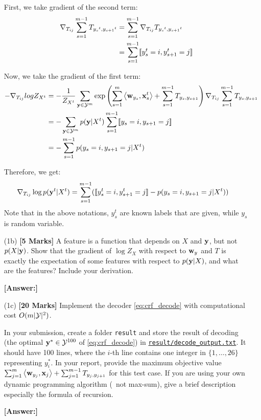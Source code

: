 \documentclass[11pt]{report}
\begin{document}
\begin{itemize}
 	First, we take gradient of the second term: 
	\begin{align}
		{\nabla}_{T_{ij}} \sum_{s=1}^{m-1} T_{{y_s}^t, {y_{s+1}}^t} &= \sum_{s=1}^{m-1} {\nabla}_{T_{ij}} T_{{y_s}^t, {y_{s+1}}^t} \\
		&= \sum_{s=1}^{m-1} [\![{y^t_s} = i, y^t_{s+1} = j]\!]
	\end{align}

 	Now, we take the gradient of the first term: 
	\begin{align}
		-{\nabla}_{T_{ij}} logZ_{X^t} &= -\frac{1}{Z_{X^t}} \sum_{\mathbf{\boldsymbol{y}} \in \mathcal{Y}^m}\exp \left(\sum_{s=1}^m \left\langle \mathbf{\boldsymbol{w}}_{y_s},\mathbf{\boldsymbol{x}}_s^t \right\rangle + \sum_{s=1}^{m-1} T_{y_s, y_{s+1}}\right) {\nabla}_{T_{ij}} \sum_{s=1}^{m-1} T_{{y_s}, {y_{s+1}}} \\
		&= -\sum_{\mathbf{\boldsymbol{y}} \in \mathcal{Y}^m}p(\mathbf{\boldsymbol{y}}|X^t) \sum_{s=1}^{m-1} [\![y_s = i, y_{s+1} = j]\!] \\
		&= -\sum_{s=1}^{m-1} p(y_s = i, y_{s+1} = j|X^t)
	\end{align}

	Therefore, we get: 
	\begin{align}
		{\nabla}_{T_{ij}} \log p(\mathbf{\boldsymbol{y}}^t|X^t) &= \sum_{s=1}^{m-1} ([\![y^t_s = i, y^t_{s+1} = j]\!] -  p(y_s = i, y_{s+1} = j|X^t))
	\end{align}
	Note that in the above notations, $y^t_s$ are known labels that are given, while $y_s$ is random variable. 

	\item[(1b)] {\bf [5 Marks]} A feature is a function that depends on $X$ and $\mathbf{\boldsymbol{y}}$, but not $p(X|\mathbf{\boldsymbol{y}})$. Show that the gradient of $\log Z_X$ with respect to $\mathbf{\boldsymbol{w}}_y$ and $T$ is exactly the expectation of some features with respect to $p(\mathbf{\boldsymbol{y}} | X)$, and what are the features? Include your derivation.

	{\bf [Answer:]} 

	\item[(1c)] {\bf [20 Marks]} Implement the decoder \eqref{eq:crf_decode} with computational cost $O(m|\mathcal{Y}|^2)$.

	In your submission, create a folder \verb#result# and store the result of decoding (the optimal $\mathbf{\boldsymbol{y}}^* \in \mathcal{Y}^{100}$ of \eqref{eq:crf_decode}) in \underline{\texttt{result/decode\_output.txt}}.
	It should have 100 lines,
	where the $i$-th line contains one integer in $\{1,\ldots,26\}$ representing $y^*_i$.
	In your report, provide the maximum objective value $\sum_{j=1}^m \left\langle \mathbf{\boldsymbol{w}}_{y_j},\mathbf{\boldsymbol{x}}_j \right\rangle + \sum_{j=1}^{m-1} T_{y_j, y_{j+1}}$ for this test case.
	If you are using your own dynamic programming algorithm (\ie\ not max-sum),
	give a brief description especially the formula of recursion.

	{\bf [Answer:]} 


\end{itemize}
\end{document}
